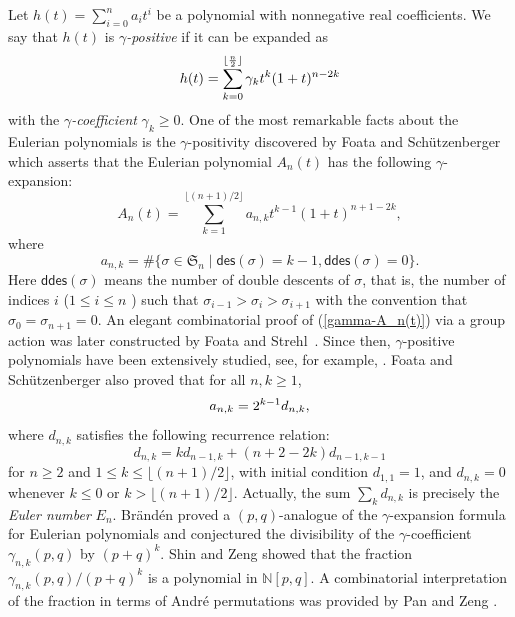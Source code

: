 \documentclass[12pt]{article}
\numberwithin{equation}{section}
\theoremstyle{plain}
\def\des{\mathsf{des}}
\def\ddes{\mathsf{ddes}}
\begin{document}
	Let $h(t)=\sum_{i=0}^{n}a_it^i$ be a polynomial with nonnegative real coefficients.
	We say that $h(t)$ is {\em $\gamma$-positive} if it can be expanded as
	$$
	h(t)=\sum_{k=0}^{\lfloor {n\over 2}\rfloor} \gamma_k t^k(1+t)^{n-2k}
	$$
	with the {\em$\gamma$-coefficient} $\gamma_k\geq 0$.    
	One of the most remarkable facts about the Eulerian polynomials is the $\gamma$-positivity discovered
	by Foata and Sch\"{u}tzenberger \cite{FS70} which asserts that the Eulerian polynomial $A_n(t)$ has the following $\gamma$-expansion:
	\begin{equation}\label{gamma-A_n(t)}
	A_n(t)=\sum\limits_{k=1}^{\lfloor{(n+1)/ 2}\rfloor}  a_{n,k}t^{k-1}(1+t)^{n+1-2k},
	\end{equation}
	where 
	$$
	a_{n,k}=\# \{\sigma\in \mathfrak{S}_n\mid  \des(\sigma)=k-1,  \ddes(\sigma)=0\}.
	$$
	Here $\ddes(\sigma)$ means the number of double descents of $\sigma$,  that is, the number of indices $i$ ($1\leq i\leq n$ ) such that $\sigma_{i-1}>\sigma_{i}>\sigma_{i+1}$ with the convention that $\sigma_0=\sigma_{n+1}=0$.
	An elegant combinatorial proof of (\ref{gamma-A_n(t)}) via a group action was later constructed by Foata and Strehl~\cite{FS74}.  Since then, $\gamma$-positive  polynomials have  been extensively studied,  see, for example,  \cite{Athanasiadis2018gamma, Branden2008actions,  ChenFuYan2023gessel, JiLin2024binomial, LinMaZhang2021multiperm, LinXuZhao2022multigamma, LinZeng2015gamma, YanHuangYang2022partialgamma, YanYangLin2026bigamma}. 
	Foata and Sch\"{u}tzenberger \cite{FS70}  also proved that for all $n,k\geq 1$, 
	\begin{equation}\label{eq-d_{n,k}}
		a_{n,k}=2^{k-1}d_{n,k},
		\end{equation}
		where  $d_{n,k}$ satisfies the following recurrence relation:
	$$
d_{n,k} = kd_{n-1,k} + (n+2- 2k)d_{n-1,k-1}
	$$
 for $n\geq 2$ and $1\le k\le \lfloor (n+1)/2\rfloor$, with initial condition $d_{1,1}=1$, and $d_{n,k}=0$ whenever $k\le 0$ or $k>\lfloor (n+1)/2\rfloor$.   
	 Actually,  the sum $\sum_k d_{n,k}$ is precisely the {\em Euler number} $E_n$. 
	  Brändén \cite{Branden2008actions} proved a $(p,q)$-analogue of the $\gamma$-expansion formula for Eulerian polynomials and conjectured the divisibility of the $\gamma$-coefficient $\gamma_{n,k}(p,q)$ by $(p+q)^k$.   Shin and Zeng \cite{ShinZeng2010} showed that the fraction $\gamma_{n,k}(p,q)/(p+q)^k$ is a polynomial in $\mathbb N[p,q]$.   A combinatorial interpretation of the  fraction in terms of André permutations  was provided by Pan and Zeng \cite{PanZeng2021}.
	 
\end{document}
